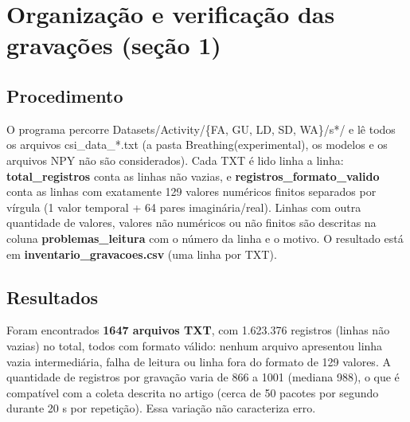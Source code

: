 \section{Organização e verificação das gravações (seção 1)}

\subsection{Procedimento}

O programa percorre Datasets/Activity/\{FA, GU, LD, SD, WA\}/s*/ e lê todos os arquivos csi\_data\_*.txt (a pasta Breathing(experimental), os modelos e os arquivos NPY não são considerados). Cada TXT é lido linha a linha: \textbf{total\_registros} conta as linhas não vazias, e \textbf{registros\_formato\_valido} conta as linhas com exatamente 129 valores numéricos finitos separados por vírgula (1 valor temporal + 64 pares imaginária/real). Linhas com outra quantidade de valores, valores não numéricos ou não finitos são descritas na coluna \textbf{problemas\_leitura} com o número da linha e o motivo. O resultado está em \textbf{inventario\_gravacoes.csv} (uma linha por TXT).

\subsection{Resultados}

Foram encontrados \textbf{1647 arquivos TXT}, com 1.623.376 registros (linhas não vazias) no total, todos com formato válido: nenhum arquivo apresentou linha vazia intermediária, falha de leitura ou linha fora do formato de 129 valores. A quantidade de registros por gravação varia de 866 a 1001 (mediana 988), o que é compatível com a coleta descrita no artigo (cerca de 50 pacotes por segundo durante 20 s por repetição). Essa variação não caracteriza erro.

